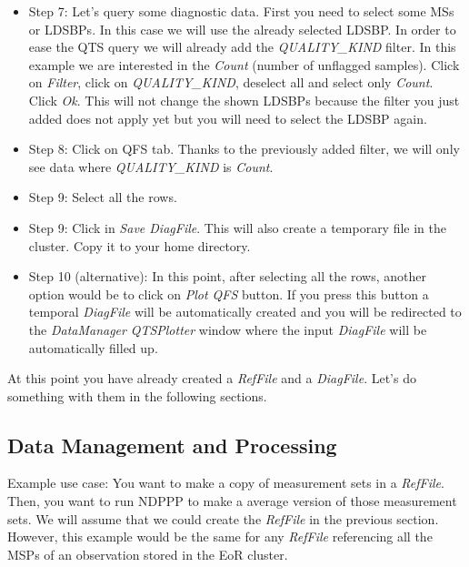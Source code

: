 \documentclass[a4paper,11pt]{article}
\begin{document}
\begin{itemize}
	\item Step 7: Let's query some diagnostic data. First you need to select some MSs or LDSBPs. In this case we will use the already selected LDSBP. In order to ease the QTS query we will already add the \textit{QUALITY\_KIND} filter. In this example we are interested in the \textit{Count} (number of unflagged samples). Click on \textit{Filter}, click on \textit{QUALITY\_KIND}, deselect all and select only \textit{Count}. Click \textit{Ok}. This will not change the shown LDSBPs because the filter you just added does not apply yet but you will need to select the LDSBP again.
	
	\item Step 8: Click on QFS tab. Thanks to the previously added filter, we will only see data where \textit{QUALITY\_KIND} is \textit{Count}.
	
	\item Step 9: Select all the rows. 
	
	\item Step 9: Click in \textit{Save DiagFile}. This will also create a temporary file in the cluster. Copy it to your home directory. 
	
	\item Step 10 (alternative): In this point, after selecting all the rows, another option would be to click on \textit{Plot QFS} button. If you press this button a temporal \textit{DiagFile} will be automatically created and you will be redirected to the \textit{DataManager} \textit{QTSPlotter} window where the input \textit{DiagFile} will be automatically filled up.
\end{itemize}

At this point you have already created a \textit{RefFile} and a \textit{DiagFile}. Let's do something with them in the following sections.

\subsection{Data Management and Processing}

Example use case: You want to make a copy of measurement sets in a \textit{RefFile}. Then, you want to run NDPPP to make a average version of those measurement sets. We will assume that we could create the \textit{RefFile} in the previous section. However, this example would be the same for any \textit{RefFile} referencing all the MSPs of an observation stored in the EoR cluster. 
\end{document}
